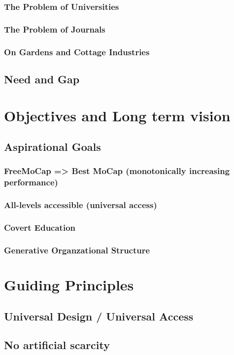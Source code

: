 \documentclass[11pt]{article}
\begin{document}
\subsubsection{The Problem of Universities}
\subsubsection{The Problem of Journals}
\subsubsection{On Gardens and Cottage Industries}
\subsection{Need and Gap}

\section{Objectives and Long term vision}
\subsection{Aspirational Goals}
\subsubsection{FreeMoCap => Best MoCap (monotonically increasing performance)}
\subsubsection{All-levels accessible (universal access)}
\subsubsection{Covert Education}
\subsubsection{Generative Organzational Structure}


\section{Guiding Principles}
\subsection{Universal Design / Universal Access}
\subsection{No artificial scarcity}
\end{document}
